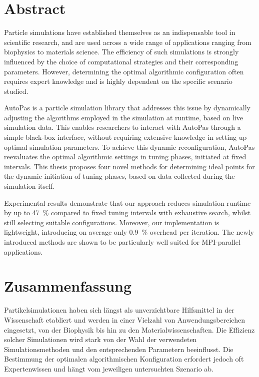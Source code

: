 \thispagestyle{plain}

\chapter*{Abstract}

Particle simulations have established themselves as an indispensable tool in scientific research, and are used across a wide range of applications ranging from biophysics to materials science. The efficiency of such simulations is strongly influenced by the choice of computational strategies and their corresponding parameters. However, determining the optimal algorithmic configuration often requires expert knowledge and is highly dependent on the specific scenario studied.

AutoPas is a particle simulation library that addresses this issue by dynamically adjusting the algorithms employed in the simulation at runtime, based on live simulation data. This enables researchers to interact with AutoPas through a simple black-box interface, without requiring extensive knowledge in setting up optimal simulation parameters. To achieve this dynamic reconfiguration, AutoPas reevaluates the optimal algorithmic settings in tuning phases, initiated at fixed intervals. This thesis proposes four novel methods for determining ideal points for the dynamic initiation of tuning phases, based on data collected during the simulation itself.

Experimental results demonstrate that our approach reduces simulation runtime by up to \qty{47}{\percent} compared to fixed tuning intervals with exhaustive search, whilst still selecting suitable configurations. Moreover, our implementation is lightweight, introducing on average only \qty{0.9}{\percent} overhead per iteration. The newly introduced methods are shown to be particularly well suited for MPI-parallel applications.


\MediaOptionLogicBlank

\chapter*{Zusammenfassung}

Partikelsimulationen haben sich längst als unverzichtbare Hilfsmittel in der Wissenschaft etabliert und werden in einer Vielzahl von Anwendungsbereichen eingesetzt, von der Biophysik bis hin zu den Materialwissenschaften. Die Effizienz solcher Simulationen wird stark von der Wahl der verwendeten Simulationsmethoden und den entsprechenden Parametern beeinflusst. Die Bestimmung der optimalen algorithmischen Konfiguration erfordert jedoch oft Expertenwissen und hängt vom jeweiligen untersuchten Szenario ab.

